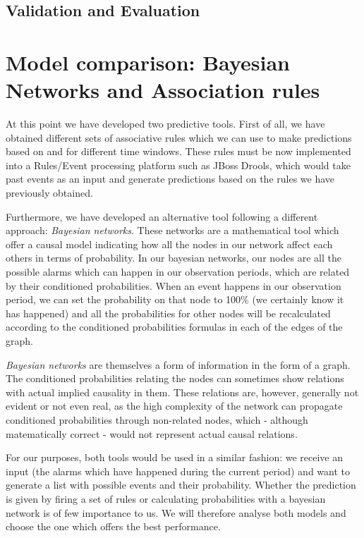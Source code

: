 \documentclass[a4paper,12pt]{article}
\begin{document}
\subsection{Validation and Evaluation}
\section{Model comparison: Bayesian Networks and Association rules}

At this point we have developed two predictive tools. First of all, we have obtained different sets of associative rules which we can use to make predictions based on and for different time windows. These rules must be now implemented into a Rules/Event processing platform such as JBoss Drools, which would take past events as an input and generate predictions based on the rules we have previously obtained.

Furthermore, we have developed an alternative tool following a different approach: \emph{Bayesian networks}. These networks are a mathematical tool which offer a causal model indicating how all the nodes in our network affect each others in terms of probability. In our bayesian networks, our nodes are all the possible alarms which can happen in our observation periods, which are related by their conditioned probabilities. When an event happens in our observation period, we can set the probability on that node to 100\% (we certainly know it has happened) and all the probabilities for other nodes will be recalculated according to the conditioned probabilities formulas in each of the edges of the graph.

\emph{Bayesian networks} are themselves a form of information in the form of a graph. The conditioned probabilities relating the nodes can sometimes show relations with actual implied causality in them. These relations are, however, generally not evident or not even real, as the high complexity of the network can propagate conditioned probabilities through non-related nodes, which - although matematically correct - would not represent actual causal relations.

For our purposes, both tools would be used in a similar fashion: we receive an input (the alarms which have happened during the current period) and want to generate a list with possible events and their probability. Whether the prediction is given by firing a set of rules or calculating probabilities with a bayesian network is of few importance to us. We will therefore analyse both models and choose the one which offers the best performance.
\end{document}
